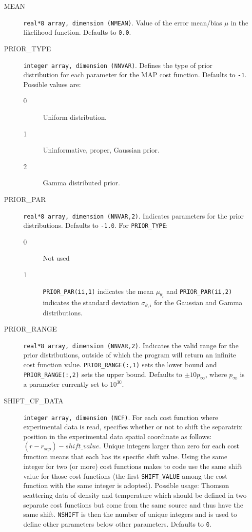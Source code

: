 \begin{description}
  \item[MEAN] {\tt real*8 array, dimension (NMEAN)}. Value of the error mean/bias $\mu$ in the likelihood function. Defaults to {\tt 0.0}.
  \item[PRIOR\_TYPE] {\tt integer array, dimension (NNVAR)}. Defines the type of prior distribution for each parameter for the MAP cost function. Defaults to {\tt -1}. Possible values are:
    \begin{description}
      \item[0] Uniform distribution.
      \item[1] Uninformative, proper, Gaussian prior.
      \item[2] Gamma distributed prior.
    \end{description}
  \item[PRIOR\_PAR] {\tt real*8 array, dimension (NNVAR,2)}. Indicates parameters for the prior distributions. Defaults to {\tt -1.0}. For {\tt PRIOR\_TYPE}:
    \begin{description}
      \item[0] Not used
      \item[1] {\tt PRIOR\_PAR(ii,1)} indicates the mean $\mu_{\theta_i}$ and {\tt PRIOR\_PAR(ii,2)} indicates the standard deviation $\sigma_{\theta,i}$ for the Gaussian and Gamma distributions.
    \end{description}
  \item[PRIOR\_RANGE] {\tt real*8 array, dimension (NNVAR,2)}. Indicates the valid range for the prior distributions, outside of which the program will return an infinite cost function value. {\tt PRIOR\_RANGE(:,1)} sets the lower bound and {\tt PRIOR\_RANGE(:,2)} sets the upper bound. Defaults to {\tt $\pm 10p_{\infty}$}, where $p_{\infty}$ is a parameter currently set to $10^{30}$.
  \item[SHIFT\_CF\_DATA] {\tt integer array, dimension (NCF)}. For each cost function where experimental data is read, specifies whether or not to shift the separatrix position in the experimental data spatial coordinate as follows: $(r - r_{sep}) - shift\_value$. Unique integers larger than zero for each cost function means that each has its specific shift value. Using the same integer for two (or more) cost functions makes to code use the same shift value for those cost functions (the first {\tt SHIFT\_VALUE} among the cost function with the same integer is adopted). Possible usage: Thomson scattering data of density and temperature which should be defined in two separate cost functions but come from the same source and thus have the same shift. {\tt NSHIFT} is then the number of unique integers and is used to define other parameters below other parameters. Defaults to {\tt 0}.

\end{description}
